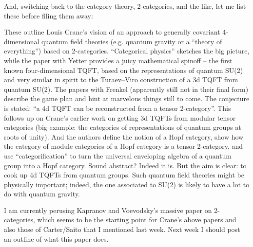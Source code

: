 And, switching back to the category theory, 2-categories, and the like, let me list these before filing them away:


These outline Louis Crane's vision of an approach to generally covariant 4-dimensional quantum field theories (e.g. quantum gravity or a ``theory of everything'') based on 2-categories. ``Categorical physics'' sketches the big picture, while the paper with Yetter provides a juicy mathematical spinoff -- the first known four-dimensional TQFT, based on the representations of quantum SU(2) and very similar in spirit to the Turaev--Viro construction of a 3d TQFT from quantum SU(2). The papers with Frenkel (apparently still not in their final form) describe the game plan and hint at marvelous things still to come. The conjecture is stated: ``a 4d TQFT can be reconstructed from a tensor 2-category''. This follows up on Crane's earlier work on getting 3d TQFTs from modular tensor categories (big example: the categories of representations of quantum groups at roots of unity). And the authors define the notion of a Hopf category, show how the category of module categories of a Hopf category is a tensor 2-category, and use ``categorification'' to turn the universal enveloping algebra of a quantum group into a Hopf category. Sound abstract? Indeed it is. But the aim is clear: to cook up 4d TQFTs from quantum groups. Such quantum field theories might be physically important; indeed, the one associated to SU(2) is likely to have a lot to do with quantum gravity.

I am currently perusing Kapranov and Voevodsky's massive paper on 2-categories, which seems to be the starting point for Crane's above papers and also those of Carter/Saito that I mentioned last week. Next week I should post an outline of what this paper does.


